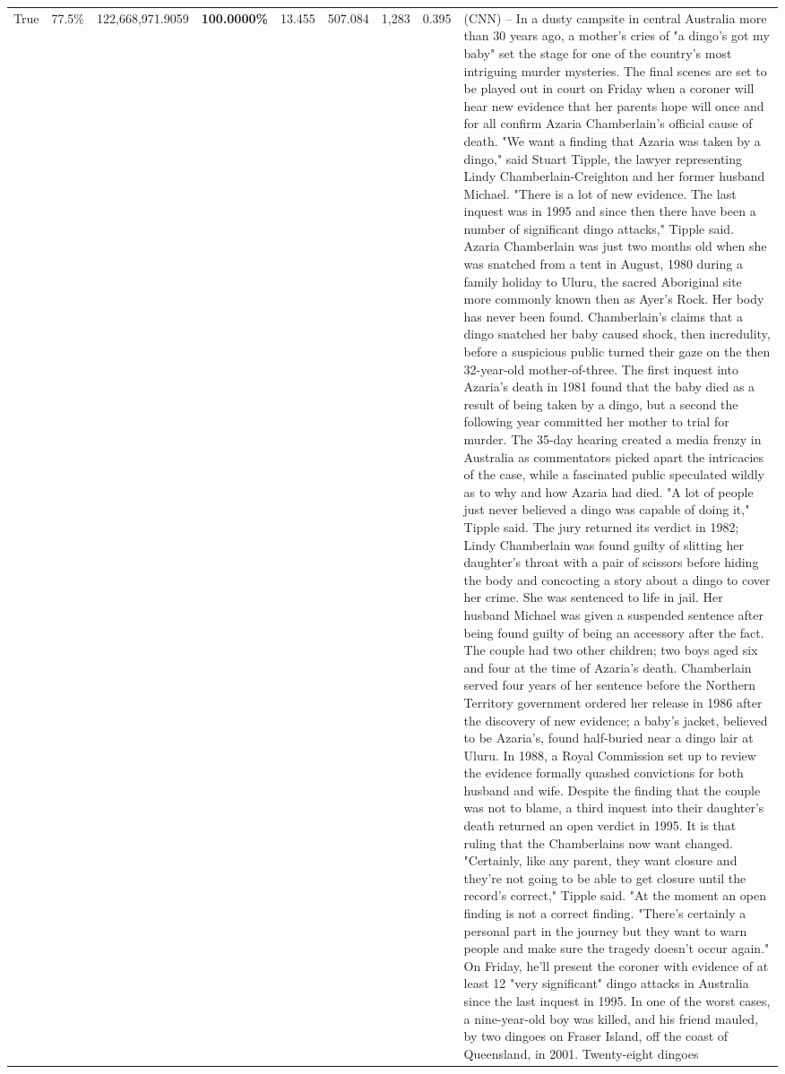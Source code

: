 \begin{table}[H]
\begin{tabular}{lllrlllll}
True & 77.5\% & 122,668,971.9059 & \bfseries \color{red} 100.0000\% & 13.455 & 507.084 & 1,283 & 0.395 & (CNN) -- In a dusty campsite in central Australia more than 30 years ago, a mother's cries of "a dingo's got my baby" set the stage for one of the country's most intriguing murder mysteries. The final scenes are set to be played out in court on Friday when a coroner will hear new evidence that her parents hope will once and for all confirm Azaria Chamberlain's official cause of death. "We want a finding that Azaria was taken by a dingo," said Stuart Tipple, the lawyer representing Lindy Chamberlain-Creighton and her former husband Michael. "There is a lot of new evidence. The last inquest was in 1995 and since then there have been a number of significant dingo attacks," Tipple said. Azaria Chamberlain was just two months old when she was snatched from a tent in August, 1980 during a family holiday to Uluru, the sacred Aboriginal site more commonly known then as Ayer's Rock. Her body has never been found. Chamberlain's claims that a dingo snatched her baby caused shock, then incredulity, before a suspicious public turned their gaze on the then 32-year-old mother-of-three. The first inquest into Azaria's death in 1981 found that the baby died as a result of being taken by a dingo, but a second the following year committed her mother to trial for murder. The 35-day hearing created a media frenzy in Australia as commentators picked apart the intricacies of the case, while a fascinated public speculated wildly as to why and how Azaria had died. "A lot of people just never believed a dingo was capable of doing it," Tipple said. The jury returned its verdict in 1982; Lindy Chamberlain was found guilty of slitting her daughter's throat with a pair of scissors before hiding the body and concocting a story about a dingo to cover her crime. She was sentenced to life in jail. Her husband Michael was given a suspended sentence after being found guilty of being an accessory after the fact. The couple had two other children; two boys aged six and four at the time of Azaria's death. Chamberlain served four years of her sentence before the Northern Territory government ordered her release in 1986 after the discovery of new evidence; a baby's jacket, believed to be Azaria's, found half-buried near a dingo lair at Uluru. In 1988, a Royal Commission set up to review the evidence formally quashed convictions for both husband and wife. Despite the finding that the couple was not to blame, a third inquest into their daughter's death returned an open verdict in 1995. It is that ruling that the Chamberlains now want changed. "Certainly, like any parent, they want closure and they're not going to be able to get closure until the record's correct," Tipple said. "At the moment an open finding is not a correct finding. "There's certainly a personal part in the journey but they want to warn people and make sure the tragedy doesn't occur again." On Friday, he'll present the coroner with evidence of at least 12 "very significant" dingo attacks in Australia since the last inquest in 1995. In one of the worst cases, a nine-year-old boy was killed, and his friend mauled, by two dingoes on Fraser Island, off the coast of Queensland, in 2001. Twenty-eight dingoes 
\end{tabular}
\end{table}
